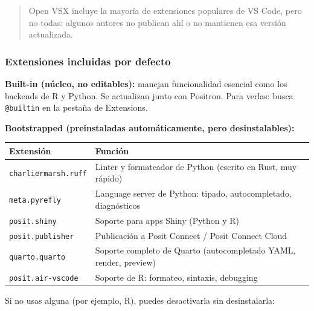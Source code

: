\documentclass[
  doc,
  floatsintext,
  longtable,
  a4paper,
  nolmodern,
  notxfonts,
  notimes,
  12pt,
  colorlinks=true,linkcolor=blue,citecolor=blue,urlcolor=blue]{apa7}
\newcounter{none} %
\begin{document}
\begin{quote}
Open VSX incluye la mayoría de extensiones populares de VS Code, pero no
todas: algunos autores no publican ahí o no mantienen esa versión
actualizada.
\end{quote}

\subsubsection{Extensiones incluidas por
defecto}\label{extensiones-incluidas-por-defecto}

\textbf{Built-in (núcleo, no editables):} manejan funcionalidad esencial
como los backends de R y Python. Se actualizan junto con Positron. Para
verlas: busca \texttt{@builtin} en la pestaña de Extensions.

\textbf{Bootstrapped (preinstaladas automáticamente, pero
desinstalables):}

{\def\LTcaptype{none} %
\begin{longtable}[]{@{}
  >{\raggedright\arraybackslash}p{}
  >{\raggedright\arraybackslash}p{}@{}}
\toprule\noalign{}
\begin{minipage}[b]{\linewidth}\raggedright
Extensión
\end{minipage} & \begin{minipage}[b]{\linewidth}\raggedright
Función
\end{minipage} \\
\midrule\noalign{}
\endhead
\bottomrule\noalign{}
\endlastfoot
\texttt{charliermarsh.ruff} & Linter y formateador de Python (escrito en
Rust, muy rápido) \\
\texttt{meta.pyrefly} & Language server de Python: tipado,
autocompletado, diagnósticos \\
\texttt{posit.shiny} & Soporte para apps Shiny (Python y R) \\
\texttt{posit.publisher} & Publicación a Posit Connect / Posit Connect
Cloud \\
\texttt{quarto.quarto} & Soporte completo de Quarto (autocompletado
YAML, render, preview) \\
\texttt{posit.air-vscode} & Soporte de R: formateo, sintaxis,
debugging \\
\end{longtable}
}

Si no usas alguna (por ejemplo, R), puedes desactivarla sin
desinstalarla:
\end{document}

